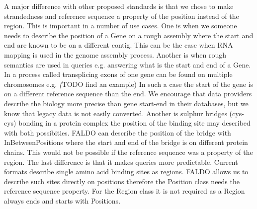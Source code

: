 A major difference with other proposed standards is that we chose to make strandedness and reference sequence a property of the position instead of the region.
This is important in a number of use cases.
One is when we someone needs to describe the position of a Gene on a rough assembly where the start and end are known to be on a different contig. 
This can be the case when RNA mapping is used in the genome assembly process.
Another is when rough semantics are used in queries e.g. answering what is the start and end of a Gene. 
In a process called transplicing exons of one gene can be found on multiple chromosomes e.g. \textit(TODO find an example)
In such a case the start of the gene is on a different reference sequence than the end.
We encourage that data providers describe the biology more precise than gene start-end in their databases, but we know that legacy data is not easily converted.
Another is sulphur bridges (cys-cys) bonding in a protein complex the position of the binding site may described with both possibities.
FALDO can describe the position of the bridge with InBetweenPositions where the start and end of the bridge is on different protein chains.
This would not be possible if the reference sequence was a property of the region. 
The last difference is that it makes queries more predictable. 
Current formats describe single amino acid binding sites as regions.
FALDO allows us to describe such sites directly on positions therefore the Position class needs the reference sequence property.
For the Region class it is not required as a Region always ends and starts with Positions.




